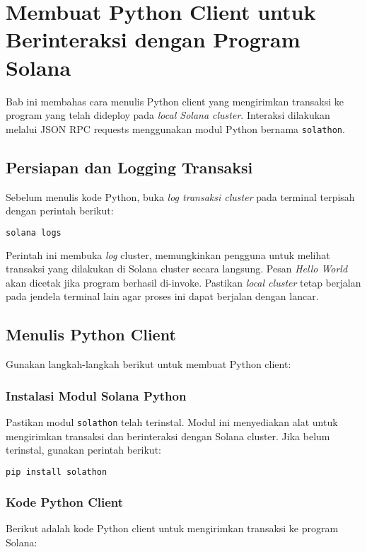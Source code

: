 \chapter{Membuat Python Client untuk Berinteraksi dengan Program Solana}

Bab ini membahas cara menulis Python client yang mengirimkan transaksi ke program yang telah dideploy pada \textit{local Solana cluster}. Interaksi dilakukan melalui JSON RPC requests menggunakan modul Python bernama \texttt{solathon}.

\section{Persiapan dan Logging Transaksi}
Sebelum menulis kode Python, buka \textit{log transaksi cluster} pada terminal terpisah dengan perintah berikut:

\begin{lstlisting}[language=bash]
	solana logs
\end{lstlisting}

Perintah ini membuka \textit{log} cluster, memungkinkan pengguna untuk melihat transaksi yang dilakukan di Solana cluster secara langsung. Pesan \textit{Hello World} akan dicetak jika program berhasil di-invoke. Pastikan \textit{local cluster} tetap berjalan pada jendela terminal lain agar proses ini dapat berjalan dengan lancar.

\section{Menulis Python Client}
Gunakan langkah-langkah berikut untuk membuat Python client:

\subsection{Instalasi Modul Solana Python}
Pastikan modul \texttt{solathon} telah terinstal. Modul ini menyediakan alat untuk mengirimkan transaksi dan berinteraksi dengan Solana cluster. Jika belum terinstal, gunakan perintah berikut:

\begin{lstlisting}[language=bash]
	pip install solathon
\end{lstlisting}

\subsection{Kode Python Client}
Berikut adalah kode Python client untuk mengirimkan transaksi ke program Solana:

